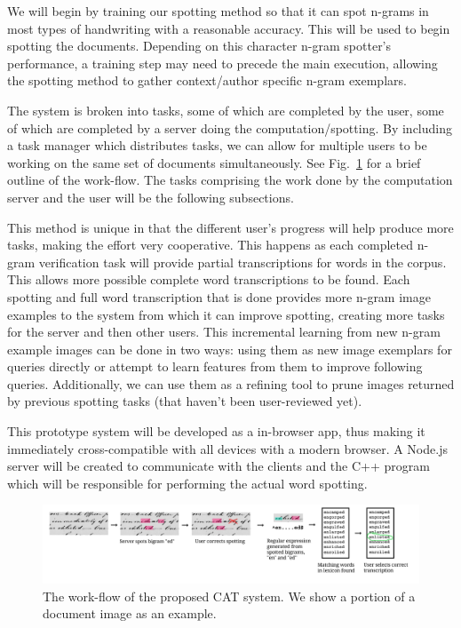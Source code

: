 \documentclass[ms]{byuprop}
\begin{document}
We will begin by training our spotting method so that it can spot n-grams in most types of handwriting with a reasonable accuracy. This will be used to begin spotting the documents. Depending on this character n-gram spotter's performance, a training step may need to precede the main execution, allowing the spotting method to gather context/author specific n-gram exemplars. 

The system is broken into tasks, some of which are completed by the user, some of which are completed by a server doing the computation/spotting. By including a task manager which distributes tasks, we can allow for multiple users to be working on the same set of documents simultaneously. See Fig.~\ref{fig:system_diagram} for a brief outline of the work-flow. The tasks comprising the work done by the computation server and the user will be the following subsections.

This method is unique in that the different user's progress will help produce more tasks, making the effort very cooperative. This happens as each completed n-gram verification task will provide partial transcriptions for words in the corpus. This allows more possible complete word transcriptions to be found. Each spotting and full word transcription that is done provides more n-gram image examples to the system from which it can improve spotting, creating more tasks for the server and then other users. This incremental learning from new n-gram example images can be done in two ways: using them as new image exemplars for queries directly or attempt to learn features from them to improve following queries. Additionally, we can use them as a refining tool to prune images returned by previous spotting tasks (that haven't been user-reviewed yet).

This prototype system will be developed as a in-browser app, thus making it immediately cross-compatible with all devices with a modern browser. A Node.js server will be created to communicate with the clients and the C++ program which will be responsible for performing the actual word spotting.

\begin{figure}[h]
    \centering
    \includegraphics[width=.98\textwidth]{flow}
    \caption{The work-flow of the proposed CAT system. We show a portion of a document image as an example.}
    \label{fig:system_diagram}
\end{figure}
\end{document}
